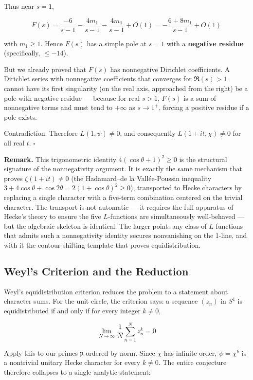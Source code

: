 \documentclass[12pt,a4paper]{article}
\begin{document}
Thus near $s=1$,

\[
F(s) = \frac{-6}{s-1} - \frac{4m_1}{s-1} - \frac{4m_1}{s-1} + O(1) = -\frac{6 + 8m_1}{s-1} + O(1)
\]

with $m_1 \geq 1$. Hence $F(s)$ has a simple pole at $s=1$ with a \textbf{negative residue} (specifically, $\leq -14$).

But we already proved that $F(s)$ has nonnegative Dirichlet coefficients. A Dirichlet series with nonnegative coefficients that converges for $\Re(s) > 1$ cannot have its first singularity (on the real axis, approached from the right) be a pole with negative residue --- because for real $s > 1$, $F(s)$ is a sum of nonnegative terms and must tend to $+\infty$ as $s \to 1^+$, forcing a positive residue if a pole exists.

Contradiction. Therefore $L(1, \psi) \neq 0$, and consequently $L(1+it, \chi) \neq 0$ for all real $t$. $\square$

\textbf{Remark.} This trigonometric identity $4(\cos\theta + 1)^2 \geq 0$ is the structural signature of the nonnegativity argument. It is exactly the same mechanism that proves $\zeta(1+it) \neq 0$ (the Hadamard--de la Vallée-Poussin inequality $3 + 4\cos\theta + \cos 2\theta = 2(1+\cos\theta)^2 \geq 0$), transported to Hecke characters by replacing a single character with a five-term combination centered on the trivial character. The transport is not automatic --- it requires the full apparatus of Hecke's theory to ensure the five $L$-functions are simultaneously well-behaved --- but the algebraic skeleton is identical. The larger point: any class of $L$-functions that admits such a nonnegativity identity secures nonvanishing on the 1-line, and with it the contour-shifting template that proves equidistribution.

\subsection{Weyl's Criterion and the Reduction}

Weyl's equidistribution criterion reduces the problem to a statement about character sums. For the unit circle, the criterion says: a sequence $(z_n)$ in $S^1$ is equidistributed if and only if for every integer $k \neq 0$,

\[
\lim_{N \to \infty} \frac{1}{N} \sum_{n=1}^N z_n^k = 0
\]

Apply this to our primes $\mathfrak{p}$ ordered by norm. Since $\chi$ has infinite order, $\psi = \chi^k$ is a nontrivial unitary Hecke character for every $k \neq 0$. The entire conjecture therefore collapses to a single analytic statement:
\end{document}
